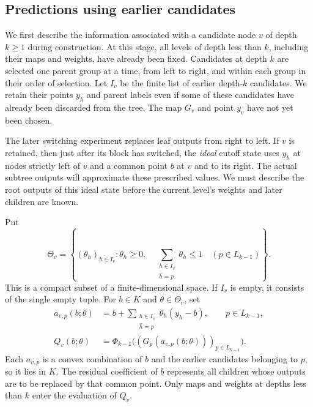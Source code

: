\subsection{Predictions using earlier candidates}

We first describe the information associated with a candidate node
$v$ of depth $k\ge1$ during construction.  At this stage, all levels
of depth less than $k$, including their maps and weights, have
already been fixed.  Candidates at depth $k$ are selected one parent
group at a time, from left to right, and within each group in their
order of selection.  Let $I_v$ be the finite list of earlier
depth-$k$ candidates.  We retain their points $y_h$ and parent labels
even if some of these candidates have already been discarded from
the tree.  The map $G_v$ and point $y_v$ have not yet been chosen.

The later switching experiment replaces leaf outputs from right to
left. If $v$ is retained, then just after its block has switched, the \emph{ideal}
cutoff state uses $y_h$ at nodes strictly left of $v$ and a common
point $b$ at $v$ and to its right. The actual subtree outputs will
approximate these prescribed values. We must describe the root
outputs of this ideal state before the current level's weights and
later children are known.

Put
\[
 \Theta_v=\left\{(\theta_h)_{h\in I_v}:
    \theta_h\ge0,\quad
    \sum_{\substack{h\in I_v\\\widehat h=p}}\theta_h\le1
       \quad(p\in L_{k-1})\right\}.
\]
This is a compact subset of a finite-dimensional space.  If $I_v$
is empty, it consists of the single empty tuple.  For $b\in K$ and
$\theta\in\Theta_v$, set
\begin{equation}
 \begin{split}
 a_{v,p}(b;\theta)
   &=b+\sum_{\substack{h\in I_v\\\widehat h=p}}
                     \theta_h(y_h-b),\qquad p\in L_{k-1},\\
 Q_v(b;\theta)
   &=\Phi_{k-1}\bigl((G_p(a_{v,p}(b;\theta)))_{p\in L_{k-1}}\bigr).
 \end{split}
 \label{eq:prediction-definition}
\end{equation}
Each $a_{v,p}$ is a convex combination of $b$ and the earlier
candidates belonging to $p$, so it lies in $K$.  The residual
coefficient of $b$ represents all children whose outputs are to be
replaced by that common point.  Only maps and weights at depths less
than $k$ enter the evaluation of $Q_v$.

